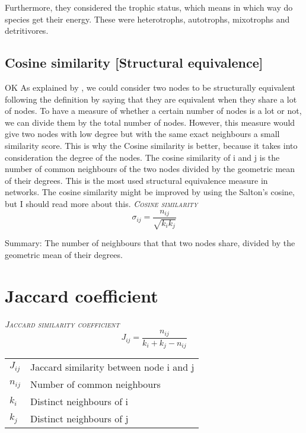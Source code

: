 \documentclass{article}
\makeatletter
\newenvironment{conditions}
  {\par\vspace{\abovedisplayskip}\noindent\begin{tabular}{>{$}l<{$} @{${}={}$} l}}
  {\end{tabular}\par\vspace{\belowdisplayskip}}
\makeatother
\begin{document}
    Furthermore, they considered the trophic status, which means in which way do species get their energy. 
    These were heterotrophs, autotrophs, mixotrophs and detritivores. 

\subsection{Cosine similarity [Structural equivalence]}	 OK 
	As explained by \citet{Newman2018}, we could consider two nodes to be structurally equivalent following the definition by saying that they are equivalent when they share a lot of nodes. To have a measure of whether a certain number of nodes is a lot or not, we can divide them by the total number of nodes. However, this measure would give two nodes with low degree but with the same exact neighbours a small similarity score. This is why the Cosine similarity is better, because it takes into consideration the degree of the nodes.  The cosine similarity of i and j is the number of common neighbours of the two nodes divided by the geometric mean of their degrees. This is the most used structural equivalence measure in networks. The cosine similarity might be improved by using the Salton's cosine, but I should read more about this. 
	\bigbreak
	\noindent \textrm{\textsc{\textsl{Cosine similarity}}} 
	\begin{equation}
		\sigma_{ij}=\frac{n_{ij}}{\sqrt{k_ik_j}}
	\end{equation}
    
Summary:  The number of neighbours that that two nodes share, divided by the geometric mean of their degrees.

\section{Jaccard coefficient}

    \bigskip
	\noindent \textrm{\textsc{\textsl{Jaccard similarity coefficient}}} 
	\begin{equation}
		J_{ij}=\frac{n_{ij}}{k_i+k_j-n_{ij}}
	\label{eqn:Jaccard}
	\end{equation}
	\begin{conditions}
		J_{ij} & Jaccard similarity between node i and j \\
		n_{ij} & Number of common neighbours \\
		k_i & Distinct neighbours of i \\
		k_j & Distinct neighbours of j \\
	\end{conditions}






\end{document}
